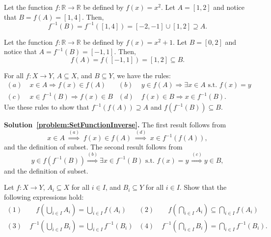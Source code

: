 \begin{example}
Let the function $f \colon \mathbb{R} \rightarrow \mathbb{R}$ be defined by $f(x)=x^2$. Let $A=[1,2]$ and notice that $B = f(A) = [1,4]$.  Then,
\[ f^{-1}(B) = f^{-1}([1,4]) = [-2,-1] \cup [1,2] \supseteq A. \]
\end{example}
\begin{example}
Let the function $f \colon \mathbb{R} \rightarrow \mathbb{R}$ be defined by $f(x)=x^2+1$. Let $B=[0,2]$ and notice that $A = f^{-1}(B) = [-1,1]$.  Then,
\[ f(A) = f([-1,1]) = [1,2] \subseteq B. \]
\end{example}

\begin{problem}
\label{problem:SetFunctionInverse}
For all $f:X\rightarrow Y$, $A\subseteq X$, and $B\subseteq Y$, we have the rules:
\begin{align*}
(a) & \; x \in A \Rightarrow f(x) \in f(A) &
(b) & \; y \in f(A) \Rightarrow \exists x\in A \textrm{ s.t. } f(x)=y \\
(c) & \; x\in f^{-1}(B) \Rightarrow f(x) \in B &
(d) & \; f(x) \in B \Rightarrow x\in f^{-1}(B) .
\end{align*}
Use these rules to show that $f^{-1}(f(A)) \supseteq A$ and $f(f^{-1}(B)) \subseteq B$.
\end{problem}
\noindent \textbf{Solution~\ref{problem:SetFunctionInverse}.}
The first result follows from
\[ x\in A \; \stackrel{(a)}{\Rightarrow} \; f(x)\in f(A) \; \stackrel{(d)}{\Rightarrow} \; x\in f^{-1}(f(A)), \]
and the definition of subset.
The second result follows from
\[ y\in f(f^{-1}(B)) \stackrel{(b)}{\Rightarrow} \exists x\in f^{-1}(B) \textrm{ s.t. } f(x)=y \, \stackrel{(c)}{\Rightarrow} y\in B, \]
and the definition of subset.

\begin{problem}
Let $f \colon X\rightarrow Y$, $A_i \subseteq X$ for all $i\in I$, and $B_i \subseteq Y$ for all $i\in I$.
Show that the following expressions hold:
\begin{align*}
(1) & \;\;\;\:\, f \left( \bigcup_{i\in I} A_i \right) = \bigcup_{i\in I} f \left( A_i \right) &
(2) & \;\;\;\:\, f \left( \bigcap_{i\in I} A_i \right) \subseteq \bigcap_{i\in I} f \left( A_i \right) \\
(3) & \; f^{-1} \left( \bigcup_{i\in I} B_i \right) = \bigcup_{i\in I} f^{-1} \left( B_i \right) &
(4) & \; f^{-1} \left( \bigcap_{i\in I} B_i \right) = \bigcap_{i\in I} f^{-1} \left( B_i \right). 
\end{align*}
\end{problem}

